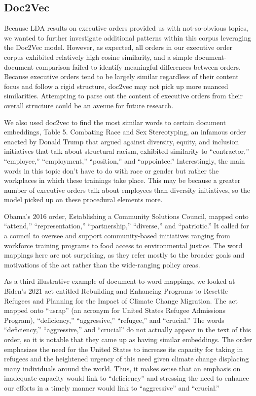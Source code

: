 \documentclass{article}
\begin{document}
{\subsection{Doc2Vec}{Because LDA results on executive orders provided us with not-so-obvious topics, we wanted to further investigate additional patterns within this corpus leveraging the Doc2Vec model. However, as expected, all orders in our executive order corpus exhibited relatively high cosine similarity, and a simple document-document comparison failed to identify meaningful differences between orders. Because executive orders tend to be largely similar regardless of their content focus and follow a rigid structure, doc2vec may not pick up more nuanced similarities. Attempting to parse out the content of executive orders from their overall structure could be an avenue for future research. 
	
We also used doc2vec to find the most similar words to certain document embeddings, Table 5. Combating Race and Sex Stereotyping, an infamous order enacted by Donald Trump that argued against diversity, equity, and inclusion initiatives that talk about structural racism, exhibited similarity to “contractor,” “employee,” “employment,” “position,” and “appointee.” Interestingly, the main words in this topic don’t have to do with race or gender but rather the workplaces in which these trainings take place. This may be because a greater number of executive orders talk about employees than diversity initiatives, so the model picked up on these procedural elements more. 
	
Obama’s 2016 order, Establishing a Community Solutions Council, mapped onto “attend,” “representation,” “partnership,” “diverse,” and “patriotic.” It called for a council to oversee and support community-based initiatives ranging from workforce training programs to food access to environmental justice. The word mappings here are not surprising, as they refer mostly to the broader goals and motivations of the act rather than the wide-ranging policy areas. 
	
As a third illustrative example of document-to-word mappings, we looked at Biden’s 2021 act entitled Rebuilding and Enhancing Programs to Resettle Refugees and Planning for the Impact of Climate Change Migration. The act mapped onto “usrap” (an acronym for United States Refugee Admissions Program), “deficiency,” “aggressive,” “refugee,” and “crucial.” The words “deficiency,” “aggressive,” and “crucial” do not actually appear in the text of this order, so it is notable that they came up as having similar embeddings. The order emphasizes the need for the United States to increase its capacity for taking in refugees and the heightened urgency of this need given climate change displacing many individuals around the world. Thus, it makes sense that an emphasis on inadequate capacity would link to “deficiency” and stressing the need to enhance our efforts in a timely manner would link to “aggressive” and “crucial.” 

}}
\end{document}
